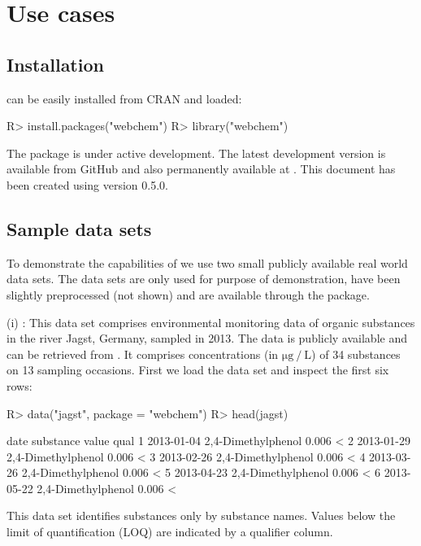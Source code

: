 \documentclass[article]{jss}
\begin{document}
\section[Use cases]{Use cases}
\subsection[Installation]{Installation}
 can be easily installed from CRAN and loaded:
%
\begin{CodeChunk}
\begin{CodeInput}
R> install.packages("webchem")
R> library("webchem")
\end{CodeInput}
\end{CodeChunk}
%
The package is under active development. The latest development
version is available from GitHub and also permanently available at \citet{zenodo}.  This document has been created using 
version 0.5.0.


\subsection[Sample data sets]{Sample data sets}
To demonstrate the capabilities of  we use two small
publicly available real world data sets.  The data sets are only used
for purpose of demonstration, have been slightly preprocessed (not
shown) and are available through the package.

(i) : This data set comprises environmental monitoring data of organic substances in the river Jagst, Germany, sampled in 2013.
The data is publicly available and can be retrieved from .
It comprises concentrations  (in $\mathrm{\mu g~/~L}$) of  34 substances  on 13 sampling occasions.
First we load the data set and inspect the first six rows:
%
\begin{CodeChunk}
\begin{CodeInput}
R> data("jagst", package = "webchem")
R> head(jagst)
\end{CodeInput}
\begin{CodeOutput}
        date          substance value qual
1 2013-01-04 2,4-Dimethylphenol 0.006    <
2 2013-01-29 2,4-Dimethylphenol 0.006    <
3 2013-02-26 2,4-Dimethylphenol 0.006    <
4 2013-03-26 2,4-Dimethylphenol 0.006    <
5 2013-04-23 2,4-Dimethylphenol 0.006    <
6 2013-05-22 2,4-Dimethylphenol 0.006    <
\end{CodeOutput}
\end{CodeChunk}
%
This data set identifies substances only by substance names. Values below the limit of quantification (LOQ) are indicated by a qualifier column.
\end{document}
